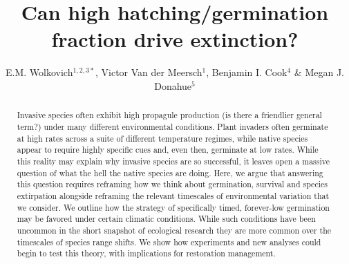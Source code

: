 \documentclass[11pt]{article}
\begin{document}
\renewcommand{\refname}{\CHead{}}

\title{Can high hatching/germination fraction drive extinction?} %
\author{E.M. Wolkovich$^{1,2,3*}$, Victor Van der Meersch$^1$, Benjamin I. Cook$^4$ \& Megan J. Donahue$^5$} 
\maketitle


\begin{abstract}
Invasive species often exhibit high propagule production (is there a friendlier general term?) under many different environmental conditions. Plant invaders often germinate at high rates across a suite of different temperature regimes, while native species appear to require highly specific cues and, even then, germinate at low rates. While this reality may explain why invasive species are so successful, it leaves open a massive question of what the hell the native species are doing. Here, we argue that answering this question requires reframing how we think about germination, survival and species extirpation alongside reframing the relevant timescales of environmental variation that we consider. We outline how the strategy of specifically timed, forever-low germination may be favored under certain climatic conditions. While such conditions have been uncommon in the short snapshot of ecological research they are more common over the timescales of species range shifts. %
We show how experiments and new analyses could begin to test this theory, with implications for restoration management. 
\end{abstract}
\end{document}
